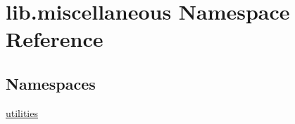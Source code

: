 \hypertarget{a00115}{\section{lib.\-miscellaneous Namespace Reference}
\label{a00115}
}
\subsection*{Namespaces}
\begin{DoxyCompactItemize}
\item 
\hyperlink{a00116}{utilities}
\end{DoxyCompactItemize}
